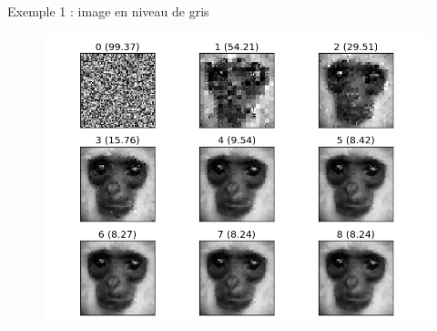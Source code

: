 \documentclass{beamer}
\begin{document}
\begin{frame}{Exemple 1 : image en niveau de gris}
\begin{center}
\begin{figure}
\includegraphics[scale=0.5]{images/monkey.png}
\end{figure}
\end{center}
\end{frame}
\end{document}
